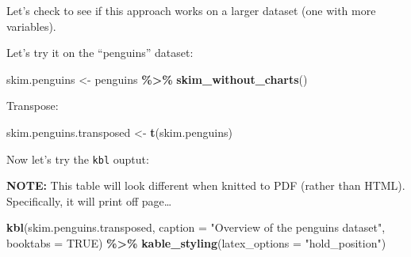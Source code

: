 \documentclass[
]{book}
\newenvironment{Shaded}{\begin{snugshade}}{\end{snugshade}}
\newcommand{\AttributeTok}[1]{\textcolor[rgb]{0.13,0.29,0.53}{#1}}
\newcommand{\ConstantTok}[1]{\textcolor[rgb]{0.56,0.35,0.01}{#1}}
\newcommand{\FunctionTok}[1]{\textcolor[rgb]{0.13,0.29,0.53}{\textbf{#1}}}
\newcommand{\NormalTok}[1]{#1}
\newcommand{\OtherTok}[1]{\textcolor[rgb]{0.56,0.35,0.01}{#1}}
\newcommand{\SpecialCharTok}[1]{\textcolor[rgb]{0.81,0.36,0.00}{\textbf{#1}}}
\newcommand{\StringTok}[1]{\textcolor[rgb]{0.31,0.60,0.02}{#1}}
\begin{document}
Let's check to see if this approach works on a larger dataset (one with more variables).

Let's try it on the ``penguins'' dataset:

\begin{Shaded}
\begin{Highlighting}[]
\NormalTok{skim.penguins }\OtherTok{\textless{}{-}}\NormalTok{ penguins }\SpecialCharTok{\%\textgreater{}\%}
  \FunctionTok{skim\_without\_charts}\NormalTok{()}
\end{Highlighting}
\end{Shaded}

Transpose:

\begin{Shaded}
\begin{Highlighting}[]
\NormalTok{skim.penguins.transposed }\OtherTok{\textless{}{-}} \FunctionTok{t}\NormalTok{(skim.penguins)}
\end{Highlighting}
\end{Shaded}

Now let's try the \texttt{kbl} ouptut:

\textbf{NOTE: }
This table will look different when knitted to PDF (rather than HTML). Specifically, it will print off page\ldots{}

\begin{Shaded}
\begin{Highlighting}[]
\FunctionTok{kbl}\NormalTok{(skim.penguins.transposed, }\AttributeTok{caption =} \StringTok{"Overview of the \textquotesingle{}penguins\textquotesingle{} dataset"}\NormalTok{,}
    \AttributeTok{booktabs =} \ConstantTok{TRUE}\NormalTok{) }\SpecialCharTok{\%\textgreater{}\%}
  \FunctionTok{kable\_styling}\NormalTok{(}\AttributeTok{latex\_options =} \StringTok{"hold\_position"}\NormalTok{)}
\end{Highlighting}
\end{Shaded}
\end{document}
